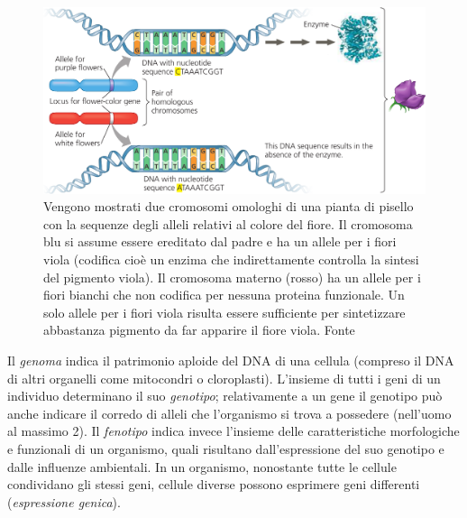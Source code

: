 \begin{figure}[!htb]
	\centering
	\includegraphics[scale=0.5]{images/geni-allele.png}
	\caption{Vengono mostrati due cromosomi omologhi di una pianta di pisello con la sequenze degli alleli relativi al colore del fiore. Il cromosoma blu si assume essere ereditato dal padre e ha un allele per i fiori viola (codifica cioè un enzima che indirettamente controlla la sintesi del pigmento viola). Il cromosoma materno (rosso) ha un allele per i fiori bianchi che non codifica per nessuna proteina funzionale. Un solo allele per i fiori viola risulta essere sufficiente per sintetizzare abbastanza pigmento da far apparire il fiore viola. Fonte\cite{campbell}}
	\label{fig:}
\end{figure}

\par Il \textit{genoma} indica il patrimonio aploide del DNA di una cellula (compreso il DNA di altri organelli come mitocondri o cloroplasti). L'insieme di tutti i geni di un individuo determinano il suo \textit{genotipo}; relativamente a un gene il genotipo può anche indicare il corredo di alleli che l'organismo si trova a possedere (nell'uomo al massimo 2). Il \textit{fenotipo} indica invece l'insieme delle caratteristiche morfologiche e funzionali di un organismo, quali risultano dall'espressione del suo genotipo e dalle influenze ambientali. In un organismo, nonostante tutte le cellule condividano gli stessi geni, cellule diverse possono esprimere geni differenti (\textit{espressione genica}).

